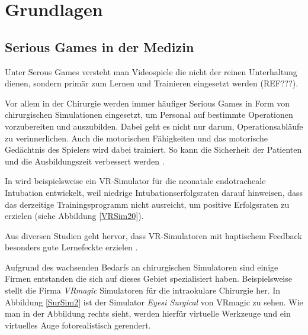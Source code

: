 \chapter{Grundlagen}

\section{Serious Games in der Medizin}



Unter Serous Games versteht man Videospiele die nicht der reinen Unterhaltung dienen, sondern primär zum Lernen und Trainieren eingesetzt werden (REF???).

Vor allem in der Chirurgie werden immer häufiger Serious Games in Form von chirurgischen Simulationen eingesetzt, um Personal auf bestimmte Operationen vorzubereiten und auszubilden. Dabei geht es nicht nur darum, Operationsabläufe zu verinnerlichen. Auch die motorischen Fähigkeiten und das motorische Gedächtnis des Spielers wird dabei trainiert. So kann die Sicherheit der Patienten und die Ausbildungszeit verbessert werden \cite{SimRole}.

In \cite{VRSim20} wird beispielsweise ein VR-Simulator für die neonatale endotracheale Intubation entwickelt, weil niedrige Intubationserfolgsraten darauf hinweisen, dass das derzeitige Trainingsprogramm nicht ausreicht, um positive Erfolgsraten zu erzielen (siehe Abbildung \ref{VRSim20}).


Aus diversen Studien geht hervor, dass VR-Simulatoren mit haptischem Feedback besonders gute Lernefeckte erzielen \cite{VRHapticSim}.

Aufgrund des wachsenden Bedarfs an chirurgischen Simulatoren sind einige Firmen entstanden die sich auf dieses Gebiet spezialisiert haben. Beispielsweise stellt die Firma \textit{VRmagic} \cite{VRmagic} Simulatoren für die intraokulare Chirurgie her. In Abbildung \ref{SurSim2} ist der Simulator \textit{Eyesi Surgical} von VRmagic zu sehen. Wie man in der Abbildung rechts sieht, werden hierfür virtuelle Werkzeuge und ein virtuelles Auge fotorealistisch gerendert.

